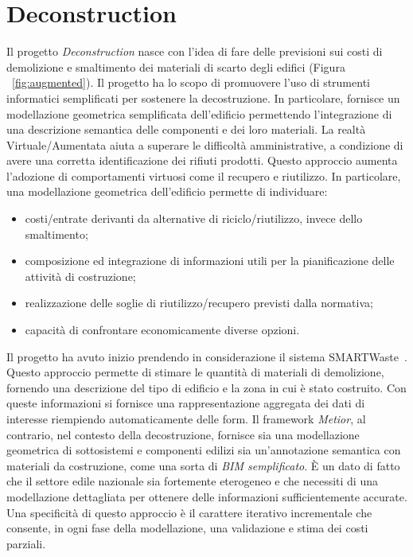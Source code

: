 \section{Deconstruction}
\label{sec:chapter_4_section_2}

Il progetto \emph{Deconstruction} nasce con l'idea di fare delle previsioni
sui costi di demolizione e smaltimento dei materiali di scarto degli edifici (Figura ~\ref{fig:augmented}).
Il progetto ha lo scopo di promuovere l'uso di strumenti informatici semplificati per sostenere la decostruzione.
In particolare, fornisce un modellazione geometrica semplificata dell'edificio permettendo l'integrazione di una descrizione
semantica delle componenti e dei loro materiali.
La realtà Virtuale/Aumentata aiuta a superare le difficoltà amministrative, a condizione di avere una
corretta identificazione dei rifiuti prodotti. Questo approccio aumenta l'adozione di comportamenti virtuosi
come il recupero e riutilizzo.
In particolare, una modellazione geometrica dell'edificio permette di individuare:
\begin{itemize}
  \item  costi/entrate derivanti da alternative di riciclo/riutilizzo, invece dello smaltimento;
  \item  composizione ed integrazione di informazioni utili per la pianificazione delle attività di costruzione;
  \item  realizzazione delle soglie di riutilizzo/recupero previsti dalla normativa;
  \item  capacità di confrontare economicamente diverse opzioni.
\end{itemize}

Il progetto ha avuto inizio prendendo in considerazione il sistema SMARTWaste~\cite{smartWaste}.
Questo approccio permette di stimare le quantità di materiali di demolizione, fornendo una descrizione del tipo di edificio
e la zona in cui è stato costruito. Con queste informazioni si fornisce una rappresentazione aggregata dei dati di
interesse riempiendo automaticamente delle form.
Il framework \emph{Metior}, al contrario, nel contesto della decostruzione, fornisce sia una modellazione geometrica di sottosistemi
e componenti edilizi sia un'annotazione semantica con materiali da costruzione, come una sorta di \emph{BIM semplificato}.
È un dato di fatto che il settore edile nazionale sia fortemente eterogeneo e che necessiti di una modellazione
dettagliata per ottenere delle informazioni sufficientemente accurate.
Una specificità di questo approccio è il carattere iterativo incrementale
che consente, in ogni fase della modellazione, una validazione e stima dei costi parziali.

